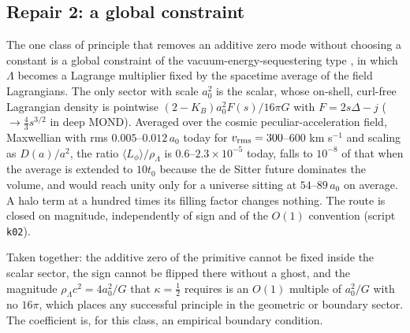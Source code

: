 \documentclass[fleqn,usenatbib]{mnras}
\begin{document}
\subsection{Repair 2: a global constraint}
The one class of principle that removes an additive zero mode without choosing a constant is a global constraint of the vacuum-energy-sequestering type \citep{KaloperPadilla2014}, in which $\Lambda$ becomes a Lagrange multiplier fixed by the spacetime average of the field Lagrangians. The only sector with scale $a_0^2$ is the scalar, whose on-shell, curl-free Lagrangian density is pointwise $(2-K_B)a_0^2F(s)/16\pi G$ with $F=2s\Delta-j$ ($\to\tfrac43s^{3/2}$ in deep MOND). Averaged over the cosmic peculiar-acceleration field, Maxwellian with rms $0.005$--$0.012\,a_0$ today for $v_{\rm rms}=300$--$600$ km s$^{-1}$ and scaling as $D(a)/a^2$, the ratio $\langle L_\phi\rangle/\rho_\Lambda$ is $0.6$--$2.3\times10^{-5}$ today, falls to $10^{-8}$ of that when the average is extended to $10t_0$ because the de Sitter future dominates the volume, and would reach unity only for a universe sitting at $54$--$89\,a_0$ on average. A halo term at a hundred times its filling factor changes nothing. The route is closed on magnitude, independently of sign and of the $O(1)$ convention (script \texttt{k02}).

Taken together: the additive zero of the primitive cannot be fixed inside the scalar sector, the sign cannot be flipped there without a ghost, and the magnitude $\rho_\Lambda c^2=4a_0^2/G$ that $\kappa=\tfrac12$ requires is an $O(1)$ multiple of $a_0^2/G$ with no $16\pi$, which places any successful principle in the geometric or boundary sector. The coefficient is, for this class, an empirical boundary condition.
\end{document}
